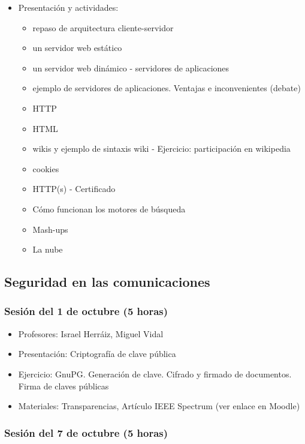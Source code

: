 \documentclass[a4paper,12pt]{article}
\begin{document}
\begin{itemize}
\item Presentación y actividades:
  \begin{itemize}
  \item repaso de arquitectura cliente-servidor
  \item un servidor web estático
  \item un servidor web dinámico - servidores de aplicaciones
  \item ejemplo de servidores de aplicaciones. Ventajas e inconvenientes (debate)
  \item HTTP
  \item HTML
  \item wikis y ejemplo de sintaxis wiki - Ejercicio: participación en wikipedia
  \item cookies
  \item HTTP(s) - Certificado
  \item Cómo funcionan los motores de búsqueda
  \item Mash-ups
  \item La nube
  \end{itemize}
\end{itemize}

\subsection{Seguridad en las comunicaciones}

\subsubsection{Sesión del 1 de octubre (5 horas)}

\begin{itemize}
\item Profesores: Israel Herr\'aiz, Miguel Vidal
\item Presentación: Criptografía de clave pública
\item Ejercicio: GnuPG. Generación de clave. Cifrado y firmado de
  documentos. Firma de claves públicas
\item Materiales: Transparencias, Artículo IEEE Spectrum (ver enlace
  en Moodle)
\end{itemize}


\subsubsection{Sesión del 7 de octubre (5 horas)}
\end{document}
